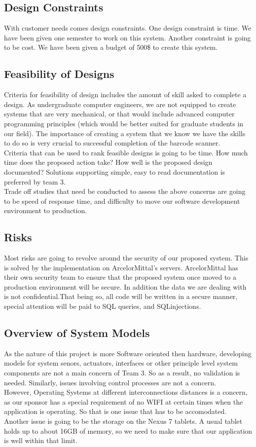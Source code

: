 \documentclass[Letter,11pt]{article}
\begin{document}
	\subsection{Design Constraints}
	With customer needs comes design constraints. One design constraint is time. We have been given one semester to work on this system. Another constraint is going to be cost. We have been given a budget of 500\$ to create this system.\\ 
	\subsection{Feasibility of Designs}
	Criteria for feasibility of design includes the amount of skill asked to complete a design. As undergraduate computer engineers, we are not equipped to create systems that are very mechanical, or that would include advanced computer programming principles (which would be better suited for graduate students in our field). The importance of creating a system that we know we have the skills to do so is very crucial to successful completion of the barcode scanner.  \\
	Criteria that can be used to rank feasible designs is going to be time. How much time does the proposed action take? How well is the proposed design documented? Solutions supporting simple, easy to read documentation is preferred by team 3. \\
	Trade off studies that need be conducted to assess the above concerns are going to be speed of response time, and difficulty to move our software development environment to production.
	\subsection{Risks}
	Most risks are going to revolve around the security of our proposed system. This is solved by the implementation on ArcelorMittal's servers. ArcelorMittal has their own security team to ensure that the proposed system once moved to a production environment will be secure. In addition the data we are dealing with is not confidential.That being so, all code will be written in a secure manner, special attention will be paid to SQL queries, and SQLinjections.   
	\subsection{Overview of System Models}
	As the nature of this project is more Software oriented then hardware, developing models for system senors, actuators, interfaces or other principle level system components are not a main concern of Team 3. So as a result, no validation is needed. Similarly, issues involving control processes are not a concern. \\
	However, Operating Systems at different interconnections distances is a concern, as our sponsor has a special requirement of no WIFI at certain times when the application is operating. So that is one issue that has to be accomodated. Another issue is going to be the storage on the Nexus 7 tablets. A usual tablet holds up to about 16GB of memory, so we need to make sure that our application is well within that limit.  \\
\end{document}
